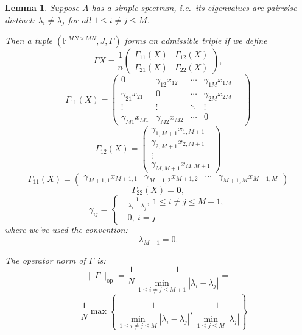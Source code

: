 \documentclass[14pt,a4paper]{extarticle}
\newtheorem{lem}{Lemma}
\theoremstyle{definition}
\begin{document}
\begin{lem}
Suppose \( A \) has a simple spectrum,
    i.e.\ its eigenvalues are pairwise distinct:
    \( \lambda_i\neq\lambda_j \) for all \( 1\leq i{\neq}j \leq M \).

    Then a tuple \( (\mathbb{F}^{{MN}{\times}{MN}}, J, \Gamma) \)
        forms an admissible triple if we define
    \[
        \Gamma X = 
        \frac1n \left(\begin{array}{c|c}
                        \Gamma_{11}(X) & \Gamma_{12}(X) \\ \hline
                        \Gamma_{21}(X) & \Gamma_{22}(X)
                      \end{array}\right),
                                      \]
    \[
        \Gamma_{11}(X) =
              \begin{pmatrix}
                0               & \gamma_{12}x_{12} & \cdots & \gamma_{1M}x_{1M} \\
                \gamma_{21}x_{21}  & 0              & \cdots & \gamma_{2M}x_{2M} \\
                \vdots          & \vdots         & \ddots & \vdots & \ \\
                \gamma_{M1}x_{M1}  & \gamma_{M2}x_{M2} & \cdots & 0
              \end{pmatrix}
    \]
    \[
        \Gamma_{12}(X) =
            \begin{pmatrix}
                \gamma_{1,M+1}x_{1,M+1} \\
                \gamma_{2,M+1}x_{2,M+1} \\
                \vdots \\
                \gamma_{M,M+1}x_{M,M+1}
            \end{pmatrix}
    \]
    \[
        \Gamma_{11}(X) =
            \begin{pmatrix}
                \gamma_{M{+}1,1}x_{M{+}1,1} &
                \gamma_{M{+}1,2}x_{M{+}1,2} &
                \cdots &
                \gamma_{M{+}1,M}x_{M{+}1,M}
            \end{pmatrix}
    \]
    \[
        \Gamma_{22}(X) = \mathbf{0},
    \]
    \[
        \gamma_{ij} = \left\{
            \begin{aligned}
                & \frac{1}{\lambda_i - \lambda_j},\ 1\leq i{\neq}j \leq M{+}1,\\
                & 0,\ i=j
            \end{aligned}
            \right.
    \]
    where we've used the convention:
    \[
        \lambda_{M{+}1} = 0.
    \]

    The operator norm of \( \Gamma \) is:
    \[
        \|\Gamma\|_{\mathrm{op}} =
        \frac1N
        \frac{1}{\min\limits_{1\leq i{\neq}j \leq M{+}1}|\lambda_i - \lambda_j|} =
        \]
    \[
        = \frac1N
         \max\left\{
         \frac{1}{
             \min\limits_{1\leq i{\neq}j \leq M }{|\lambda_i - \lambda_j|}},
         \frac{1}{
             \min\limits_{1\leq j \leq M}{|\lambda_j|}}
         \right\}
        \]
\end{lem}
\end{document}
